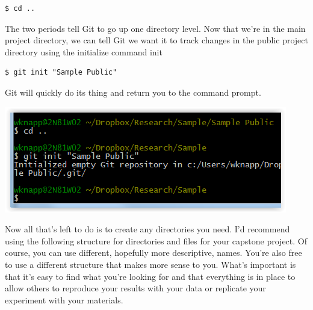 \documentclass[12pt]{article}
\begin{document}
\begin{verbatim}
$ cd ..
\end{verbatim}

The two periods tell Git to go up one directory level. Now that we're in the main project
directory, we can tell Git we want it to track changes in the public project directory
using the initialize command init

\begin{verbatim}
$ git init "Sample Public"
\end{verbatim}

Git will quickly do its thing and return you to the command prompt.

\includegraphics{imgs/Git06.PNG}

Now all that's left to do is to create any directories you need. I'd recommend using the following
structure for directories and files for your capstone project. Of course, you can use different,
hopefully more descriptive, names. You're also free to use a different structure that makes more
sense to you. What's important is that it's easy to find what you're looking for and that
everything is in place to allow others to reproduce your results with your data or replicate
your experiment with your materials.
\end{document}
